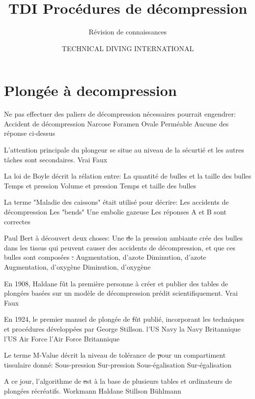\documentclass[english,10pt,a4paper,twoside]{article}
\title{TDI Procédures de décompression}
\subtitle{Révision de connaissances}
\author{TECHNICAL DIVING INTERNATIONAL}
\begin{document}
\sloppy


	\section{Plongée à decompression}

	\begin{outline}
		\1 Ne pas effectuer des paliers de décompression nécessaires pourrait engendrer:
			\2 Accident de décompression
			\2 Narcose
			\2 Foramen Ovale Perméable
			\2 Aucune des réponse ci-dessus

		\1 L'attention principale du plongeur se situe au niveau de la sécurtié et les autres tâches sont secondaires.
			\2 Vrai
			\2 Faux

		\1 La loi de Boyle décrit la rélation entre:
			\2 La quantité de bulles et la taille des bulles
			\2 Temps et pression
			\2 Volume et pression
			\2 Temps et taille des bulles

		\1 La terme "Maladie des caissons" était utilisé pour décrire:
			\2 Les accidents de décompression
			\2 Les "bends"
			\2 Une embolie gazeuse
			\2 Les réponses A et B sont correctes

		\1 Paul Bert à découvert deux choses: Une \st de la pression ambiante crée des bulles dans les tissus qui peuvent causer des accidents de décompression, et que ces bulles sont composées \st.
			\2 Augmentation, d'azote
			\2 Diminution, d'azote
			\2 Augmentation, d'oxygène
			\2 Diminution, d'oxygène

		\1 En 1908, Haldane fût la première personne à créer et publier des tables de plongées basées sur un modèle de décompression prédit scientifiquement.
			\2 Vrai
			\2 Faux

		\1 En 1924, le premier manuel de plongée de \st fût publié, incorporant les techniques et procédures développées par George Stillson.
			\2 l'US Navy
			\2 la Navy Britannique
			\2 l'US Air Force
			\2 l'Air Force Britannique

		\1 Le terme M-Value décrit la niveau de tolérance de \st pour un compartiment tissulaire donné:
			\2 Sous-pression
			\2 Sur-pression
			\2 Sous-égalisation
			\2 Sur-égalisation

		\1 A ce jour, l'algorithme de \st est à la base de plusieurs tables et ordinateurs de plongées récréatifs.
			\2 Workmann
			\2 Haldane
			\2 Stillson
			\2 Bühlmann
	\end{outline}
	\vfill
	\pagebreak
\end{document}

